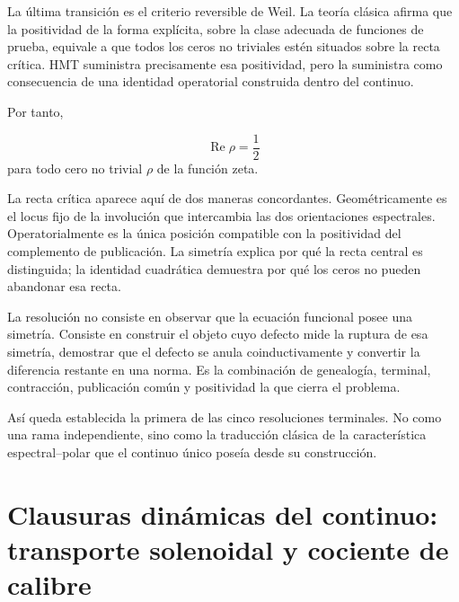 La última transición es el criterio reversible de Weil. La teoría clásica afirma que la positividad de la forma explícita, sobre la clase adecuada de funciones de prueba, equivale a que todos los ceros no triviales estén situados sobre la recta crítica. HMT suministra precisamente esa positividad, pero la suministra como consecuencia de una identidad operatorial construida dentro del continuo.\par
{}
Por tanto,\par
\[
\operatorname{Re}\rho=\frac12
\]
para todo cero no trivial \(\rho\) de la función zeta.\par
La recta crítica aparece aquí de dos maneras concordantes. Geométricamente es el locus fijo de la involución que intercambia las dos orientaciones espectrales. Operatorialmente es la única posición compatible con la positividad del complemento de publicación. La simetría explica por qué la recta central es distinguida; la identidad cuadrática demuestra por qué los ceros no pueden abandonar esa recta.\par
La resolución no consiste en observar que la ecuación funcional posee una simetría. Consiste en construir el objeto cuyo defecto mide la ruptura de esa simetría, demostrar que el defecto se anula coinductivamente y convertir la diferencia restante en una norma. Es la combinación de genealogía, terminal, contracción, publicación común y positividad la que cierra el problema.\par
Así queda establecida la primera de las cinco resoluciones terminales. No como una rama independiente, sino como la traducción clásica de la característica espectral–polar que el continuo único poseía desde su construcción.\par

\section{Clausuras dinámicas del continuo: transporte solenoidal y cociente de calibre}
